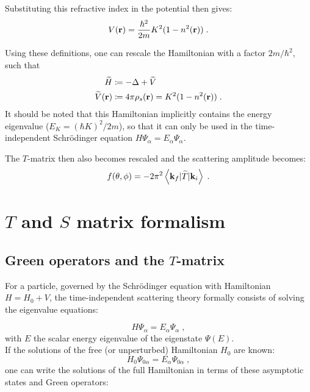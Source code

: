 Substituting this refractive index in the potential then gives:
\begin{equation*}
  V(\mathbf{r}) = \frac{\hbar^2}{2m}K^2(1-n^2(\mathbf{r})) \; .
\end{equation*}

Using these definitions, one can rescale the Hamiltonian with a factor $2m/\hbar^2$, such that
\begin{align*}
  \widetilde{H} &\coloneqq -\Delta + \widetilde{V} \nonumber \\
  \widetilde{V}(\mathbf{r}) &\coloneqq 4\pi\rho_s(\mathbf{r}) = K^2(1-n^2(\mathbf{r})) \; .
\end{align*}
It should be noted that this Hamiltonian implicitly contains the energy eigenvalue ($E_{K}=(\hbar K)^2/2m$), so that it can only be used in the time-independent Schr\"odinger equation $H\Psi_\alpha = E_\alpha \Psi_\alpha$.

The $T$-matrix then also becomes rescaled and the scattering amplitude becomes:
\begin{equation*}
  f(\theta, \phi) = -2\pi^2 \left\langle \mathbf{k}_f \vert \widetilde{T} \vert \mathbf{k}_i \right\rangle \; .
\end{equation*}


\section{\boldmath$T$ and $S$ matrix formalism}


\subsection{Green operators and the $T$-matrix}

For a particle, governed by the Schr\"odinger equation with Hamiltonian $H = H_0 + V$, the time-independent scattering theory formally consists of solving the eigenvalue equations:

\begin{equation*}
  H\Psi_\alpha = E_\alpha\Psi_\alpha \; ,
\end{equation*}
with $E$ the scalar energy eigenvalue of the eigenstate $\Psi(E)$.\\
If the solutions of the free (or unperturbed) Hamiltonian $H_0$ are known:
\begin{equation*}
  H_0\Psi_{0\alpha} = E_\alpha\Psi_{0\alpha} \; ,
\end{equation*}
one can write the solutions of the full Hamiltonian in terms of these asymptotic states and Green operators:

